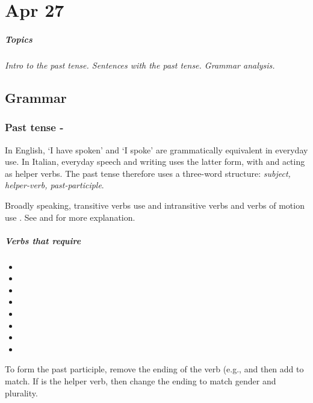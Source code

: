 \chapter{Apr 27}
\paragraph{Topics}
\textit{Intro to the past tense. Sentences with the past tense. Grammar analysis.}

\section{Grammar} \label{0427-Grammar}
\subsection{Past tense - }

In English, `I have spoken' and `I spoke' are grammatically equivalent in everyday use. In Italian,
everyday speech and writing uses the latter form, with  and  acting as helper verbs.
The past tense therefore uses a three-word structure: \textit{subject, helper-verb, past-participle}.

Broadly speaking, transitive verbs use  and intransitive verbs and verbs of motion use .
See \cite{SanFilippo} and \cite{Ragusa} for more explanation.

\paragraph{Verbs that require }
\begin{itemize}[nosep]
    \item {}
    \item {}
    \item {}
    \item {}
    \item {}
    \item {}
    \item {}
    \item {}
\end{itemize}


To form the past participle, remove the ending of the verb (e.g.,  and then add 
 to match. If  is the helper verb, then change the ending to match gender and plurality. 

